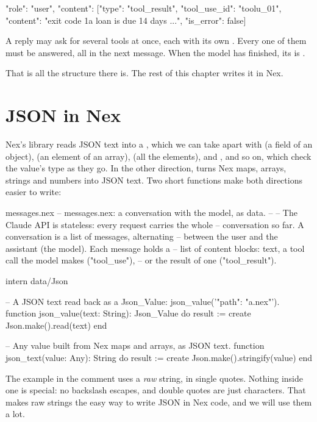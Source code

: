 \begin{json}
{"role": "user",
 "content": [{"type": "tool_result", "tool_use_id": "toolu_01",
              "content": "exit code 1\nPASS a loan is due 14 days ...", "is_error": false}]}
\end{json}

A reply may ask for several tools at once, each with its own .
Every one of them must be answered, all in the next message. When the
model has finished, its  is .

That is all the structure there is. The rest of this chapter writes it in
Nex.

\section{JSON in Nex}

Nex's  library reads JSON text into a ,
which we can take apart with  (a field of an object), 
(an element of an array),  (all the elements), and
,  and so on, which check the value's type
as they go. In the other direction,  turns Nex maps, arrays,
strings and numbers into JSON text. Two short functions make both
directions easier to write:

\begin{newfile}{messages.nex}
-- messages.nex: a conversation with the model, as data.
--
-- The Claude API is stateless: every request carries the whole
-- conversation so far. A conversation is a list of messages, alternating
-- between the user and the assistant (the model). Each message holds a
-- list of content blocks: text, a tool call the model makes ("tool_use"),
-- or the result of one ("tool_result").

intern data/Json

-- A JSON text read back as a Json_Value: json_value('{"path": "a.nex"}').
function json_value(text: String): Json_Value do
  result := create Json.make().read(text)
end

-- Any value built from Nex maps and arrays, as JSON text.
function json_text(value: Any): String do
  result := create Json.make().stringify(value)
end
\end{newfile}

The example in the comment uses a \emph{raw} string, in single quotes.
Nothing inside one is special: no backslash escapes, and double quotes are
just characters. That makes raw strings the easy way to write JSON in Nex
code, and we will use them a lot.

